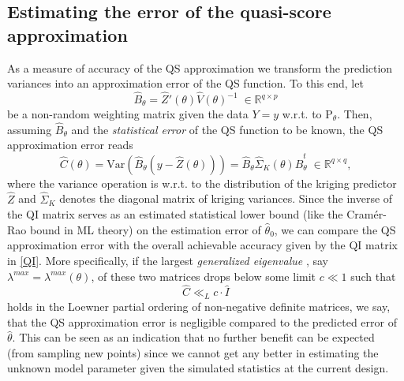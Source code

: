\documentclass[article, nojss]{jss}
\numberwithin{equation}{section}			%
\newcommand{\R}{\mathbb{R}}
\newcommand{\Ptheta}{\mathrm{P}_{\theta}}
\begin{document}
\subsection{Estimating the error of the quasi-score approximation}\label{qsErr}
As a measure of accuracy of the QS approximation we transform the prediction
variances into an approximation error of the QS function. To this end, let
\begin{equation}
 \hat{B}_\theta=\hat{Z}'(\theta)\hat{V}(\theta)^{-1}\;\in\R^{q\times p}
\end{equation}
be a non-random weighting matrix given the data $Y = y$ w.r.t. to $\Ptheta$.
Then, assuming $\hat{B}_\theta$ and the \emph{statistical error} of the QS
function to be known, the QS approximation error reads
\begin{equation}\label{qsError}
 \hat{C}(\theta) =
 \textrm{Var}(\hat{B}_\theta(y-\hat{Z}(\theta)))=\hat{B}_\theta\hat{\Sigma}_K(\theta)\hat{B}_\theta^t\;\in\R^{q\times q},
\end{equation}
where the variance operation is w.r.t. to the distribution of the kriging
predictor $\hat{Z}$ and $\hat{\Sigma}_K$ denotes the diagonal matrix of kriging variances.
Since the inverse of the QI matrix serves as an estimated statistical lower
bound (like the Cram\'{e}r-Rao bound in ML theory) on the estimation error of $\hat{\theta}_0$,
we can compare the QS approximation error with the overall achievable accuracy
given by the QI matrix in \eqref{QI}. More specifically, if the largest
\emph{generalized eigenvalue} \citep[see, e.\,g.][]{ref:Golub1996}, say
$\lambda^{max}=\lambda^{max}(\theta)$, of these two matrices drops below some
limit $c\ll1$ such that
\begin{equation}
 \hat{C} \ll_L c\cdot\hat{I}
\end{equation}
holds in the Loewner partial ordering of non-negative definite matrices, we
say, that the QS approximation error is negligible compared to the predicted
error of $\hat{\theta}$. This can be seen as an indication that no further
benefit can be expected (from sampling new points) since we cannot get any better
in estimating the unknown model parameter given the simulated statistics at the
current design.
%
\end{document}
